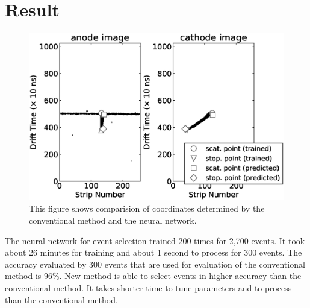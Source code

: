 \documentclass{jps-cp}
\begin{document}
\section{Result}
\begin{figure}
  \vspace{-6zw}
  \centering
  \includegraphics[clip, width=25zw]{eps/compare_mono.eps}
  \caption{This figure shows comparision of coordinates determined by the conventional method and the neural network.}
  \label{fig:result_detection}
  \vspace{-2zw}
\end{figure}

The neural network for event selection trained 200 times for 2,700 events.
It took about 26 minutes for training and about 1 second to process for 300 events.
The accuracy evaluated by 300 events that are used for evaluation of the conventional method
is 96\%.
New method is able to select events in higher accuracy than the conventional method.
It takes shorter time to tune parameters and to process than the conventional method.
\end{document}
